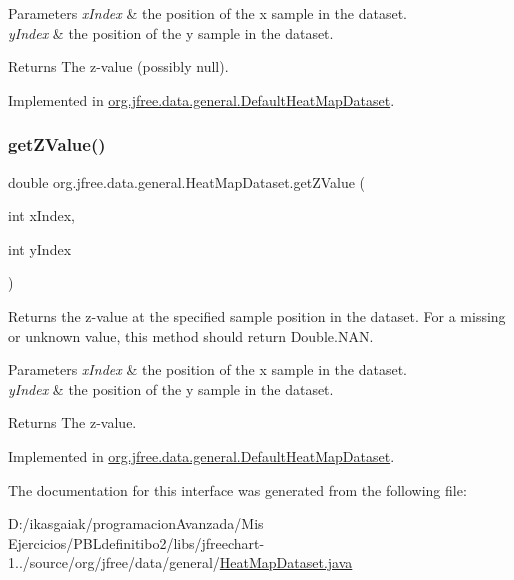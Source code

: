 \begin{DoxyParams}{Parameters}
{\em x\+Index} & the position of the x sample in the dataset. \\
\hline
{\em y\+Index} & the position of the y sample in the dataset.\\
\hline
\end{DoxyParams}
\begin{DoxyReturn}{Returns}
The z-\/value (possibly {\ttfamily null}). 
\end{DoxyReturn}


Implemented in \mbox{\hyperlink{classorg_1_1jfree_1_1data_1_1general_1_1_default_heat_map_dataset_a8d76ab265c9da8926a9d956f9a3bdc28}{org.\+jfree.\+data.\+general.\+Default\+Heat\+Map\+Dataset}}.

\mbox{\label{interfaceorg_1_1jfree_1_1data_1_1general_1_1_heat_map_dataset_ad4c5c315a22d263edf0da447693fb0d7}} 
\subsubsection{\texorpdfstring{get\+Z\+Value()}{getZValue()}}
{\footnotesize\ttfamily double org.\+jfree.\+data.\+general.\+Heat\+Map\+Dataset.\+get\+Z\+Value (\begin{DoxyParamCaption}\item[{int}]{x\+Index,  }\item[{int}]{y\+Index }\end{DoxyParamCaption})}

Returns the z-\/value at the specified sample position in the dataset. For a missing or unknown value, this method should return Double.\+N\+AN.


\begin{DoxyParams}{Parameters}
{\em x\+Index} & the position of the x sample in the dataset. \\
\hline
{\em y\+Index} & the position of the y sample in the dataset.\\
\hline
\end{DoxyParams}
\begin{DoxyReturn}{Returns}
The z-\/value. 
\end{DoxyReturn}


Implemented in \mbox{\hyperlink{classorg_1_1jfree_1_1data_1_1general_1_1_default_heat_map_dataset_a93219a73fd817685f8e9ea06ad9d570b}{org.\+jfree.\+data.\+general.\+Default\+Heat\+Map\+Dataset}}.



The documentation for this interface was generated from the following file\+:\begin{DoxyCompactItemize}
\item 
D\+:/ikasgaiak/programacion\+Avanzada/\+Mis Ejercicios/\+P\+B\+Ldefinitibo2/libs/jfreechart-\/1../source/org/jfree/data/general/\mbox{\hyperlink{_heat_map_dataset_8java}{Heat\+Map\+Dataset.\+java}}\end{DoxyCompactItemize}
